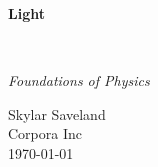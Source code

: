 \clearpage
\vspace*{1.5in}
\begin{center}
  \begin{minipage}{\textwidth}
    \centering
    \Huge\bfseries
    \linespread{1.25}\selectfont
  Light
  \end{minipage}
  \\[3em]
  {\Large\itshape\linespread{1.3}\selectfont
  Foundations of Physics\par}
  \vfill
  {\large Skylar Saveland}
  \\[1em]
  {\large Corpora Inc}
  \\[1em]
  {\large \today}
\end{center}
\clearpage
